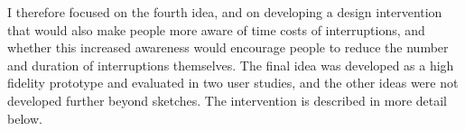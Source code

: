 I therefore focused on the fourth idea, and on developing a design intervention that would also make people more aware of time costs of interruptions, and whether this increased awareness would encourage people to reduce the number and duration of interruptions themselves. The final idea was developed as a high fidelity prototype and evaluated in two user studies, and the other ideas were not developed further beyond sketches. The intervention is described in more detail below.

